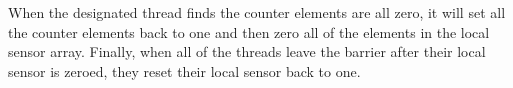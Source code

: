 When the designated thread finds the counter elements are all zero, it
will set all the counter elements back to one and then zero all of the
elements in the local sensor array.  Finally, when all of the threads
leave the barrier after their local sensor is zeroed, they reset their
local sensor back to one.





